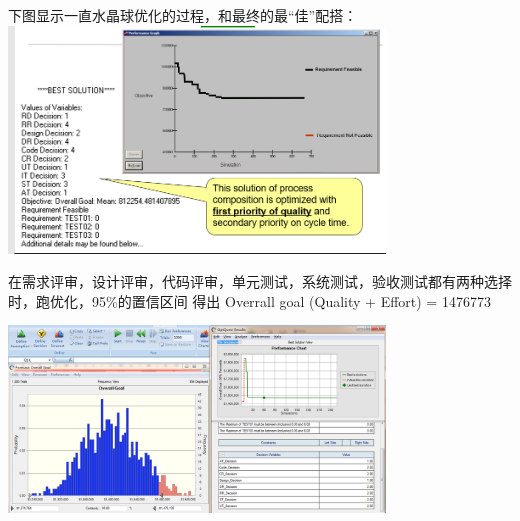 下图显示一直水晶球优化的过程，和最终的最``佳''配搭：\\

\includegraphics[width=10cm]{HmttOptScreenshot_2021-10-08_165653.png}

在需求评审，设计评审，代码评审，单元测试，系统测试，验收测试都有两种选择时，跑优化，95\%的置信区间
得出 Overrall goal (Quality + Effort) = 1476773


\includegraphics[width=10cm]{微信截图_20211103023018.png}



